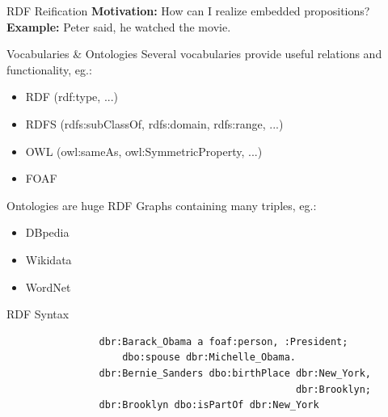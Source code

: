 \documentclass[11pt]{beamer}
\begin{document}
		\begin{frame}{RDF Reification}
			\textbf{Motivation:} How can I realize embedded propositions?\\
			\vspace{10pt}
			\textbf{Example:} Peter said, he watched the movie.\\ 
			\vspace{15pt}
			
			
			
		\end{frame}
		
		\begin{frame}{Vocabularies \& Ontologies}
			Several vocabularies provide useful relations and functionality, eg.:
			\begin{itemize}
				\item RDF (rdf:type, ...)
				\item RDFS (rdfs:subClassOf, rdfs:domain, rdfs:range, ...)
				\item OWL (owl:sameAs, owl:SymmetricProperty, ...)
				\item FOAF
			\end{itemize}
			
			Ontologies are huge RDF Graphs containing many triples, eg.:
			\begin{itemize}
				\item DBpedia
				\item Wikidata
				\item WordNet
			\end{itemize}						
		\end{frame}
		
		\begin{frame}[fragile]{RDF Syntax}
			\begin{verbatim}
				dbr:Barack_Obama a foaf:person, :President;
				    dbo:spouse dbr:Michelle_Obama.
				dbr:Bernie_Sanders dbo:birthPlace dbr:New_York, 
				                                  dbr:Brooklyn;
				dbr:Brooklyn dbo:isPartOf dbr:New_York 	
			\end{verbatim}
		\end{frame}
		
\end{document}
